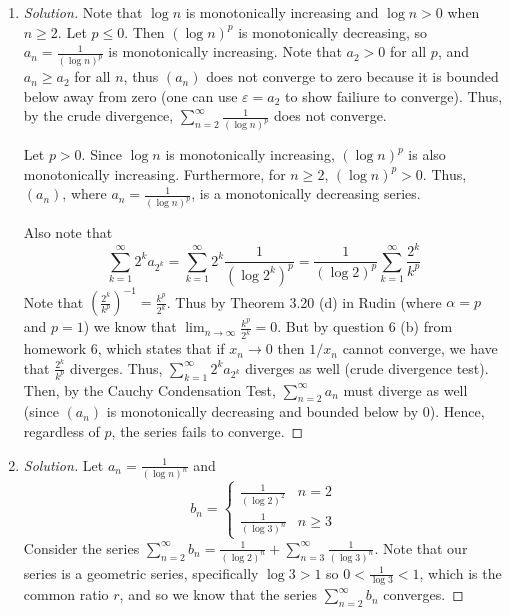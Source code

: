 \documentclass{article}
\newcommand{\ep}{{\varepsilon}}
\begin{document}
\begin{enumerate}
	\item \begin{proof}[Solution]\let\qed\relax
		Note that $\log{n}$ is monotonically increasing
		and $\log{n} > 0$ when $n \geq 2$.
		Let $p \leq 0$.
		Then $(\log{n})^p$ is monotonically decreasing,
		so $a_n = \frac{1}{(\log{n})^p}$ is monotonically increasing.
		Note that $a_2 > 0$ for all $p$,
		and $a_n \geq a_2$ for all $n$,
		thus $(a_n)$ does not converge to zero
		because it is bounded below away from zero
		(one can use $\ep = a_2$ to show failiure to converge).
		Thus, by the crude divergence,
		$\sum_{n=2}^\infty \frac{1}{(\log{n})^p}$
		does not converge.

		Let $p > 0$.
		Since $\log{n}$ is monotonically increasing,
		$(\log{n})^p$ is also monotonically increasing.
		Furthermore, for $n \geq 2$, $(\log{n})^p > 0$.
		Thus, $(a_n)$, where $a_n = \frac{1}{(\log{n})^p}$,
		is a monotonically decreasing series.
		
		Also note that
		\[
			\sum_{k=1}^\infty 2^k a_{2^k}
			= \sum_{k=1}^\infty 2^k \frac{1}{(\log{2^k})^p}
			= \frac{1}{(\log{2})^p}\sum_{k=1}^\infty \frac{2^k}{k^p}
		\]
		Note that $\left(\frac{2^k}{k^p}\right)^{-1} = \frac{k^p}{2^k}$.
		Thus by Theorem 3.20 (d) in Rudin
		(where $\alpha = p$ and $p = 1$)
		we know that $\lim_{n\to\infty}\frac{k^p}{2^k} = 0$.
		But by question 6 (b) from homework 6,
		which states that if $x_n \to 0$ then $1/x_n$ cannot converge,
		we have that $\frac{2^k}{k^p}$ diverges.
		Thus, $\sum_{k=1}^\infty 2^k a_{2^k}$
		diverges as well
		(crude divergence test).
		Then, by the Cauchy Condensation Test,
		$\sum_{n=2}^\infty a_n$ must diverge as well
		(since $(a_n)$ is monotonically decreasing
		and bounded below by $0$).
		Hence, regardless of $p$, the series fails to converge.
	\end{proof}
	\item \begin{proof}[Solution]\let\qed\relax
		Let $a_n = \frac{1}{(\log{n})^n}$
		and
		\[
			b_n = \begin{cases}
				\frac{1}{(\log{2})^2} & n = 2\\
				\frac{1}{(\log{3})^n} & n \geq 3
			\end{cases}
		\]
		Consider the series $\sum_{n=2}^\infty b_n =
		\frac{1}{(\log{2})^n} + \sum_{n=3}^\infty \frac{1}{(\log{3})^n}$.
		Note that our series is a geometric series,
		specifically $\log{3} > 1$ so $0 < \frac{1}{\log{3}} < 1$,
		which is the common ratio $r$,
		and so we know that the series $\sum_{n=2}^\infty b_n$ converges.


\end{proof}
\end{enumerate}
\end{document}
